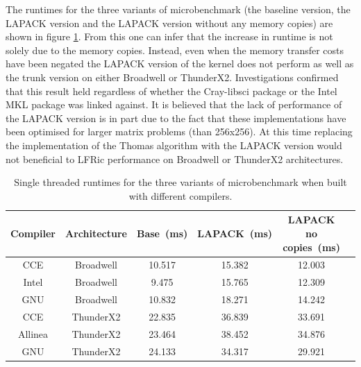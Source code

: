 The runtimes for the three variants of microbenchmark (the baseline version, the LAPACK version and the LAPACK version without any memory copies) are shown in figure \ref{tab:lapack_table}.
From this one can infer that the increase in runtime is not solely due to the memory copies.
Instead, even when the memory transfer costs have been negated the LAPACK version of the kernel does not perform as well as the trunk version on either Broadwell or ThunderX2.
Investigations confirmed that this result held regardless of whether the Cray-libsci package or the Intel MKL package was linked against.
It is believed that the lack of performance of the LAPACK version is in part due to the fact that these implementations have been optimised for larger matrix problems (than 256x256).
At this time replacing the implementation of the Thomas algorithm with the LAPACK version would not beneficial to LFRic performance on Broadwell or ThunderX2 architectures.

\begin{table}[t]
  \scriptsize
  \begin{center}
    \caption{Single threaded runtimes for the three variants of microbenchmark when built with different compilers.}
    \label{tab:lapack_table}
     \begin{tabular}{|c|c|c|c|c|c|}
      \textbf{Compiler} & \textbf{Architecture} & \textbf{Base~(ms)} & \textbf{LAPACK~(ms)} & \textbf{LAPACK no copies~(ms)} \\
      \hline
      CCE & Broadwell & 10.517 & 15.382 & 12.003 \\
      Intel & Broadwell & 9.475 & 15.765 & 12.309 \\
      GNU & Broadwell & 10.832 & 18.271 & 14.242 \\
      CCE & ThunderX2 & 22.835 & 36.839 & 33.691 \\
      Allinea & ThunderX2 & 23.464 & 38.452 & 34.876 \\
      GNU & ThunderX2 & 24.133 & 34.317 & 29.921 \\
    \end{tabular}
  \end{center}
\end{table}
